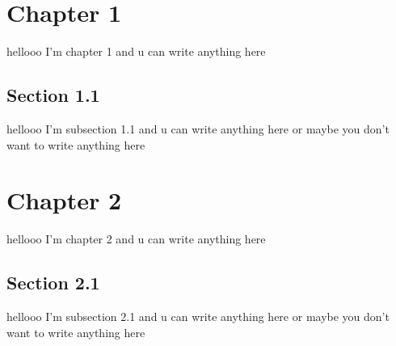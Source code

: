 \section{Chapter 1}
hellooo I'm chapter 1 and u can write anything here

\subsection{Section 1.1}
hellooo I'm subsection 1.1 and u can write anything here or maybe you don't want to write anything here

\section{Chapter 2}
hellooo I'm chapter 2 and u can write anything here

\subsection{Section 2.1}
hellooo I'm subsection 2.1 and u can write anything here or maybe you don't want to write anything here
